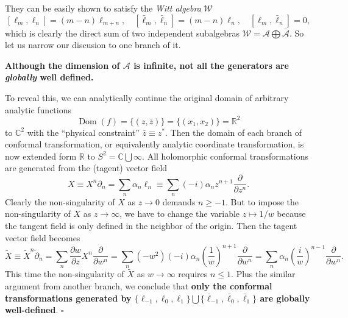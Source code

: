 \documentclass[10pt,nofootinbib]{revtex4}
\newcounter{Claim}[section]
\newenvironment{Claim}[1][]{{\par\normalfont\bfseries \underline{Claim~\stepcounter{Claim}\arabic{Claim}.}~#1~~}}{\par}
\newenvironment{Proof}{{\par~{\normalfont\bfseries $\vartriangleright$}~~}}{\hfill $\square$\par\hfill\par} %
\begin{document}
		They can be easily shown to satisfy the \emph{Witt algebra} $\mathcal{W}$
		\begin{equation}\label{1.2.3}
			[\ell_m,\ell_n]=(m-n)\ell_{m+n},\quad[\bar\ell_m,\bar\ell_n]=(m-n)\ell_n,\quad[\ell_m,\bar\ell_n]=0,
		\end{equation}
		which is clearly the direct sum of two independent subalgebras $\mathcal{W}=\mathcal{A}\bigoplus\bar{\mathcal{A}}$. So let us narrow our discusion to one branch of it.\par
		\begin{Claim}
			\textbf{{\color{red} Although the dimension of $\mathcal{A}$ is infinite, not all the generators are \emph{globally} well defined.}}
		\end{Claim}
		\begin{Proof}
			To reveal this, we can analytically continue the original domain of arbitrary analytic functions
			\begin{equation*}
				\mathop{\mathrm{Dom}}(f)=\{(z,\bar z)\}=\{(x_1,x_2)\}=\mathbb{R}^2
			\end{equation*}
			to $\mathbb{C}^2$ with the ``physical constraint'' $\bar z\equiv z^*$. Then the domain of each branch of conformal transformation, or equivalently analytic coordinate transformation, is now extended form $\mathbb{R}$ to $S^2=\mathbb{C}\bigcup\infty$. All holomorphic conformal transformations are generated from the (tagent) vector field
			\begin{equation*}
				X\equiv X^n \partial_n=\sum_n \alpha_n\ell_n\equiv\sum_n(-i)\alpha_n z^{n+1}\dfrac{\partial }{\partial z^n}.
			\end{equation*}
			Clearly the non-singularity of $X$ as $z\rightarrow0$ demands $n\geq-1$. But to impose the non-singularity of $X$ as $z\rightarrow\infty$, we have to change the variable $z\mapsto1/w$ because the tangent field is only defined in the neighbor of the origin. Then the tagent vector field becomes
			\begin{equation*}
				\widetilde{X}\equiv\widetilde{X}^n\widetilde{\partial}_n=\sum_n\dfrac{\partial w}{\partial z} X^n\dfrac{\partial }{\partial w^n}=\sum_n(-w^2)(-i)\alpha_n\left(\dfrac{1}{w}\right)^{n+1}\dfrac{\partial }{\partial w^n}=\sum_n \alpha_n\left(\dfrac{i}{w}\right)^{n-1}\dfrac{\partial }{\partial w^n}.
			\end{equation*}
			This time the non-singularity of $\widetilde{X}$ as $w\rightarrow\infty$ requires $n\leq1$. Plus the similar argument from another branch, we conclude that \textbf{\color{red}only the conformal transformations generated by $\{\ell_{-1},\ell_0,\ell_1\}\bigcup\{\bar\ell_{-1},\bar\ell_0,\bar\ell_1\}$ are globally well-defined}. 
		\end{Proof}
		
\end{document}

